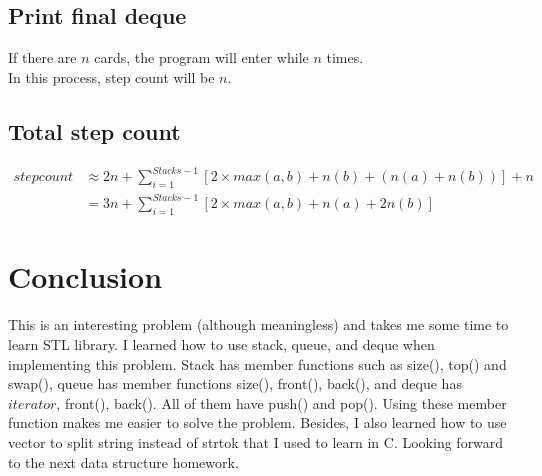 \documentclass[12pt]{article}
\begin{document}
\subsection{Print final deque}
If there are $n$ cards, the program will enter while $n$ times.\\
In this process, step count will be $n$.
\subsection{Total step count}
\begin{align*}
  stepcount & \approx 2n + \sum_{i=1}^{Stacks-1}\left[2\times max(a,b)+n(b)+(n(a)+n(b))\right]+n\\
            & = 3n + \sum_{i=1}^{Stacks-1}\left[2\times max(a,b)+n(a)+2n(b)\right]
\end{align*}
\section{Conclusion}
This is an interesting problem (although meaningless) and takes me some time to learn STL library. I learned how to use stack, queue, and deque when implementing this problem. Stack has member functions such as size(), top() and swap(), queue has member functions size(), front(), back(), and deque has $iterator$, front(), back(). All of them have push() and pop(). Using these member function makes me easier to solve the problem. Besides, I also learned how to use vector to split string instead of strtok that I used to learn in C. Looking forward to the next data structure homework.
\end{document}
